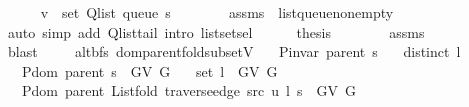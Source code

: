 \begin{isabellebody}
\ \ \ \ \isamarkupfalse%
\ {\isachardoublequoteopen}v\ {\isasymin}\ set\ {\isacharparenleft}{\kern0pt}Q{\isacharunderscore}{\kern0pt}list\ {\isacharparenleft}{\kern0pt}queue\ s{\isacharparenright}{\kern0pt}{\isacharparenright}{\kern0pt}{\isachardoublequoteclose}\isanewline
\ \ \ \ \ \ \isamarkupfalse%
\ assms{\isacharparenleft}{\kern0pt}{}{\isacharcomma}{\kern0pt}\ {}{\isacharparenright}{\kern0pt}\ list{\isacharunderscore}{\kern0pt}queue{\isacharunderscore}{\kern0pt}non{\isacharunderscore}{\kern0pt}empty\isanewline
\ \ \ \ \ \ \isamarkupfalse%
\ {\isacharparenleft}{\kern0pt}auto\ simp\ add{\isacharcolon}{\kern0pt}\ Q{\isachardot}{\kern0pt}list{\isacharunderscore}{\kern0pt}tail\ intro{\isacharcolon}{\kern0pt}\ list{\isachardot}{\kern0pt}set{\isacharunderscore}{\kern0pt}sel{\isacharparenleft}{\kern0pt}{}{\isacharparenright}{\kern0pt}{\isacharparenright}{\kern0pt}\isanewline
\ \ \ \ \isamarkupfalse%
\ {\isacharquery}{\kern0pt}thesis\isanewline
\ \ \ \ \ \ \isamarkupfalse%
\ assms{\isacharparenleft}{\kern0pt}{}{\isacharparenright}{\kern0pt}\isanewline
\ \ \ \ \ \ \isamarkupfalse%
\ blast\isanewline
\ \ \isamarkupfalse%
\isanewline
{}\isamarkupfalse%
%
\endisatagproof
{\isafoldproof}%
%
\isadelimproof
\isanewline
%
\endisadelimproof
%
\isadeliminvisible
\isanewline
%
\endisadeliminvisible
%
\isataginvisible
{}\isamarkupfalse%
\ {\isacharparenleft}{\kern0pt}\ alt{\isacharunderscore}{\kern0pt}bfs{\isacharparenright}{\kern0pt}\ dom{\isacharunderscore}{\kern0pt}parent{\isacharunderscore}{\kern0pt}fold{\isacharunderscore}{\kern0pt}subset{\isacharunderscore}{\kern0pt}V{\isacharcolon}{\kern0pt}\isanewline
\ \ \ {\isachardoublequoteopen}P{\isacharunderscore}{\kern0pt}invar\ {\isacharparenleft}{\kern0pt}parent\ s{\isacharparenright}{\kern0pt}{\isachardoublequoteclose}\isanewline
\ \ \ {\isachardoublequoteopen}distinct\ l{\isachardoublequoteclose}\isanewline
\ \ \ {\isachardoublequoteopen}P{\isachardot}{\kern0pt}dom\ {\isacharparenleft}{\kern0pt}parent\ s{\isacharparenright}{\kern0pt}\ {\isasymsubseteq}\ G{\isachardot}{\kern0pt}V\ G{\isachardoublequoteclose}\isanewline
\ \ \ {\isachardoublequoteopen}set\ l\ {\isasymsubseteq}\ G{\isachardot}{\kern0pt}V\ G{\isachardoublequoteclose}\isanewline
\ \ \ {\isachardoublequoteopen}P{\isachardot}{\kern0pt}dom\ {\isacharparenleft}{\kern0pt}parent\ {\isacharparenleft}{\kern0pt}List{\isachardot}{\kern0pt}fold\ {\isacharparenleft}{\kern0pt}traverse{\isacharunderscore}{\kern0pt}edge\ src\ u{\isacharparenright}{\kern0pt}\ l\ s{\isacharparenright}{\kern0pt}{\isacharparenright}{\kern0pt}\ {\isasymsubseteq}\ G{\isachardot}{\kern0pt}V\ G{\isachardoublequoteclose}%

\end{isabellebody}

